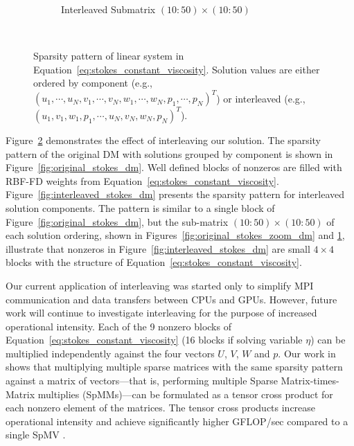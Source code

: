 \begin{figure}[ht]
\begin{subfigure}[b]{0.4\textwidth}
		\caption{Interleaved Submatrix $(10:50) \times (10:50)$}
		\label{fig:interleaved_stokes_zoom_dm}
	\end{subfigure} \\
\caption{Sparsity pattern of linear system in Equation~\ref{eq:stokes_constant_viscosity}. Solution values are either ordered by component (e.g., $( u_1, \cdots, u_N, v_1, \cdots, v_N, w_1, \cdots, w_N, p_1, \cdots, p_N)^T$) or interleaved (e.g., $( u_1, v_1, w_1, p_1,\cdots, u_N, v_N, w_N, p_N)^T$). }
\label{fig:interleaved_solution}
\end{figure} 

Figure~\ref{fig:interleaved_solution} demonstrates the effect of interleaving our solution. The sparsity pattern of the original DM with solutions grouped by component is shown in Figure~\ref{fig:original_stokes_dm}. Well defined blocks of nonzeros are filled with RBF-FD weights from Equation~\ref{eq:stokes_constant_viscosity}. Figure~\ref{fig:interleaved_stokes_dm} presents the sparsity pattern for interleaved solution components. The pattern is similar to a single block of Figure~\ref{fig:original_stokes_dm}, but the sub-matrix $(10:50)\times(10:50)$ of each solution ordering, shown in Figures~\ref{fig:original_stokes_zoom_dm} and \ref{fig:interleaved_stokes_zoom_dm}, illustrate that nonzeros in Figure~\ref{fig:interleaved_stokes_dm} are small $4\times4$ blocks with the structure of Equation~\ref{eq:stokes_constant_viscosity}.

Our current application of interleaving was started only to simplify MPI communication and data transfers between CPUs and GPUs. However, future work will continue to investigate interleaving for the purpose of increased operational intensity. Each of the 9 nonzero blocks of Equation~\ref{eq:stokes_constant_viscosity} (16 blocks if solving variable $\eta$) can be multiplied independently against the four vectors $U$, $V$, $W$ and $p$. Our work in \cite{ErlebacherSauleFlyerBollig2013} shows that multiplying multiple sparse matrices with the same sparsity pattern against a matrix of vectors---that is, performing multiple Sparse Matrix-times-Matrix multiplies (SpMMs)---can be formulated as a tensor cross product for each nonzero element of the matrices. The tensor cross products increase operational intensity and achieve significantly higher GFLOP/sec compared to a single SpMV \cite{ErlebacherSauleFlyerBollig2013}.  %





